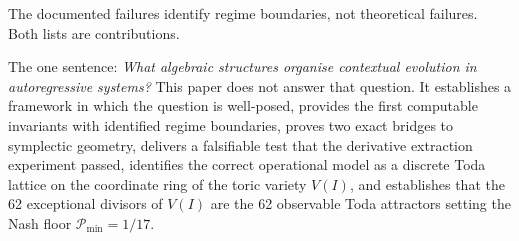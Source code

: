 \documentclass[11pt]{amsart}
\theoremstyle{definition}
\begin{document}
The documented failures identify regime boundaries,
not theoretical failures.
Both lists are contributions.

The one sentence: \emph{What algebraic structures organise contextual
evolution in autoregressive systems?}
This paper does not answer that question.
It establishes a framework in which the question is well-posed,
provides the first computable invariants with identified regime boundaries,
proves two exact bridges to symplectic geometry,
delivers a falsifiable test that the derivative extraction experiment passed,
identifies the correct operational model as a discrete Toda lattice on
the coordinate ring of the toric variety $V(I)$,
and establishes that the 62 exceptional divisors of $V(I)$ are the
62 observable Toda attractors setting the Nash floor $\mathcal{P}_{\min} = 1/17$.
\end{document}
